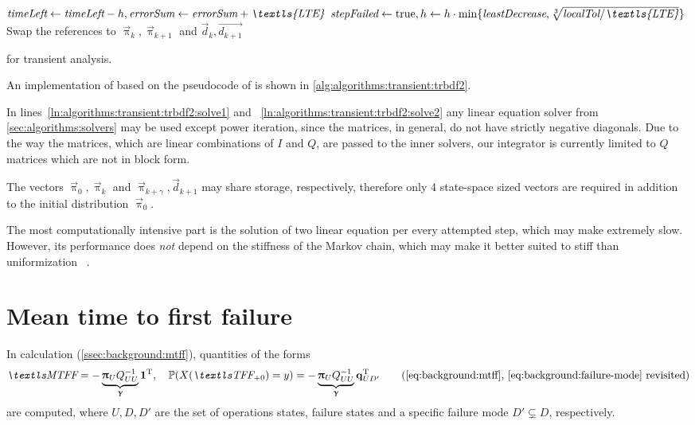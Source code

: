 \begin{algorithmpage}
{{{        $\textit{timeLeft} \gets \textit{timeLeft} - h,
        \textit{errorSum} \gets \textit{errorSum} +
        \textit{\textls{LTE}}$\;
        \;
      }
      $\textit{stepFailed} \gets \KwTrue, h \gets h \cdot \min\{
      \textit{leastDecrease}, \sqrt[3]{\textit{localTol} /
        \textit{\textls{LTE}}} \}$\;
    }
    Swap the references to $\vec{\uppi}_k, \vec{\uppi}_{k + 1}$ and
    $\vec{d}_k, \vec{d_{k + 1}}$\;
  }
  \;
  \caption{ for transient analysis.}
  \label{alg:algorithms:transient:trbdf2}
\end{algorithmpage}

An implementation of  based on the pseudocode of
\citet{DBLP:journals/cor/ReibmanT88} is shown in
\vref{alg:algorithms:transient:trbdf2}.

In lines~\ref{ln:algorithms:transient:trbdf2:solve1} and~%
\ref{ln:algorithms:transient:trbdf2:solve2} any linear equation solver
from \vref{sec:algorithms:solvers} may be used except power iteration,
since the matrices, in general, do not have strictly negative
diagonals. Due to the way the matrices, which are linear combinations
of $I$ and $Q$, are passed to the inner solvers, our 
integrator is currently limited to $Q$ matrices which are not in block
form.

The vectors $\vec{\uppi}_0, \vec{\uppi}_k$ and
$\vec{\uppi}_{k + \gamma}, \vec{d}_{k + 1}$ may share storage,
respectively, therefore only 4 state-space sized vectors are required
in addition to the initial distribution $\vec{\uppi}_0$.

The most computationally intensive part is the solution of two linear
equation per every attempted step, which may make 
extremely slow. However, its performance does \emph{not} depend on the
stiffness of the Markov chain, which may make it better suited to stiff
 than uniformization%
~\citep{DBLP:journals/cor/ReibmanT88}.

\section{Mean time to first failure}

In  calculation (\vref{ssec:background:mtff}), quantities
of the forms
\begin{equation}
  \MTFF = - \underbrace{\vec{\uppi}_U Q_{UU}^{-1}}_{\vec{\upgamma}} \vec{1}^\T, \quad
  \Pr(X(\TFF_{+ 0}) = y) = - \underbrace{\vec{\uppi}_U Q_{UU}^{-1}}_{\vec{\upgamma}} \vec{q}_{UD'}^\T
  \tag{\ref{eq:background:mtff}, \ref{eq:background:failure-mode}
    revisited}
\end{equation}
are computed, where $U, D, D'$ are the set of operations states,
failure states and a specific failure mode $D' \subsetneq D$,
respectively.

